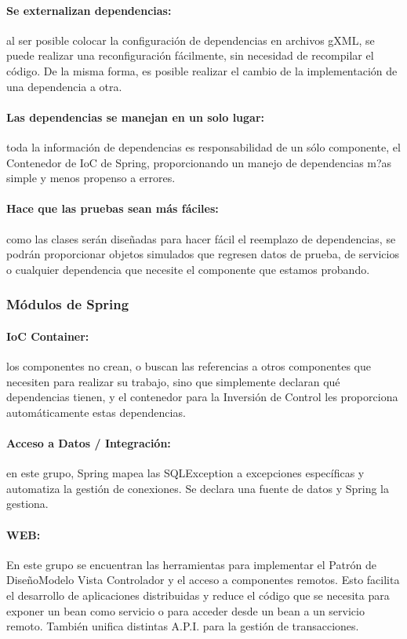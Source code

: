 \documentclass[12pt,a4paper,spanish]{book} %
\begin{document}
\paragraph{Se externalizan dependencias: }al ser posible colocar la configuración de dependencias en archivos gXML, se puede realizar una reconfiguración fácilmente, sin necesidad de recompilar el código. De la misma forma, es posible realizar el cambio de la implementación de una dependencia a otra.

\paragraph{Las dependencias se manejan en un solo lugar: }toda la información de dependencias es responsabilidad de un sólo componente, el Contenedor de IoC de Spring, proporcionando un manejo de dependencias m?as simple y menos propenso a errores.

\paragraph{Hace que las pruebas sean más fáciles: }como las clases serán diseñadas para hacer fácil el reemplazo de dependencias, se podrán proporcionar objetos simulados que regresen datos de prueba, de servicios o cualquier dependencia que necesite el componente que estamos probando.

\subsubsection{Módulos de Spring}

\paragraph{IoC Container: }los componentes no crean, o buscan las referencias a otros componentes que necesiten para realizar su trabajo, sino que simplemente declaran qué dependencias tienen, y el contenedor para la Inversión de Control les proporciona automáticamente estas dependencias.

\paragraph{Acceso a Datos / Integración: }en este grupo, Spring mapea las SQLException a excepciones específicas y automatiza la gestión de conexiones. Se declara una fuente de datos y Spring la gestiona.

\paragraph{WEB: }En este grupo se encuentran las herramientas para implementar el Patrón de DiseñoModelo Vista Controlador y el acceso a componentes remotos. Esto facilita el desarrollo de aplicaciones distribuidas y reduce el código que se necesita para exponer un bean como servicio o para acceder desde un bean a un servicio remoto. También unifica distintas A.P.I. para la gestión de transacciones.
\end{document}
